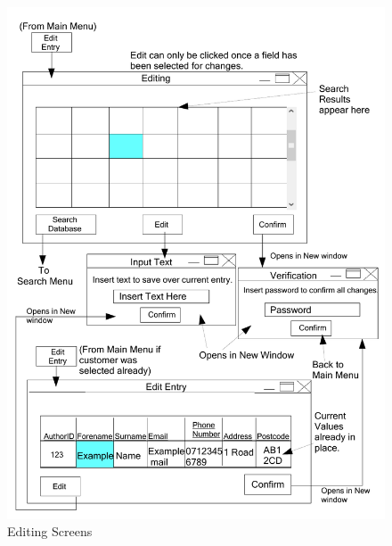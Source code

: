 \begin{figure}[H]
    \caption{Editing Screens} \label{Editing_Screens.pdf}
    \includegraphics[width=\textwidth]{./Design/UserInterfaceDesign/Editing_Screens.pdf}
\end{figure}

